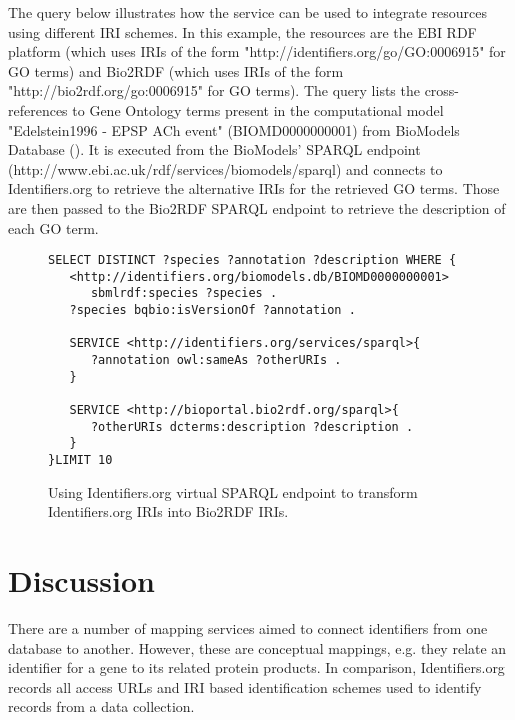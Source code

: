 \documentclass{bioinfo}
\begin{document}
The query below illustrates how the service can be used to integrate resources using different IRI schemes. In this example, the resources are the EBI RDF platform (which uses IRIs of the form "http://identifiers.org/go/GO:0006915" for GO terms) and Bio2RDF (which uses IRIs of the form "http://bio2rdf.org/go:0006915" for GO terms). The query lists the cross-references to Gene Ontology terms present in the computational model "Edelstein1996 - EPSP ACh event" (BIOMD0000000001) from BioModels Database (\cite{Li2010}). It is executed from the BioModels' SPARQL endpoint (http://www.ebi.ac.uk/rdf/services/biomodels/sparql) and connects to Identifiers.org to retrieve the alternative IRIs for the retrieved GO terms. Those are then passed to the Bio2RDF SPARQL endpoint to retrieve the description of each GO term.

\begin{figure}[h]
{\scriptsize
\begin{verbatim}
SELECT DISTINCT ?species ?annotation ?description WHERE { 
   <http://identifiers.org/biomodels.db/BIOMD0000000001> 
      sbmlrdf:species ?species . 
   ?species bqbio:isVersionOf ?annotation .

   SERVICE <http://identifiers.org/services/sparql>{
      ?annotation owl:sameAs ?otherURIs .
   }

   SERVICE <http://bioportal.bio2rdf.org/sparql>{
      ?otherURIs dcterms:description ?description .
   }        
}LIMIT 10
\end{verbatim}
}
  \caption{Using Identifiers.org virtual SPARQL endpoint to transform Identifiers.org IRIs into Bio2RDF IRIs.}
  \label{translatestuff}
\end{figure}


\section{Discussion}
There are a number of mapping services aimed to connect identifiers from one database to another. However, these are conceptual mappings, e.g. they relate an identifier for a gene to its related protein products. In comparison, Identifiers.org records all access URLs and IRI based identification schemes used to identify records from a data collection.
\end{document}
